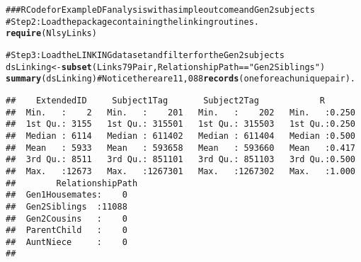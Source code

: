 \documentclass[letterpaper]{article}\usepackage{graphicx, color}
\makeatletter
\newcommand{\hlfunctioncall}[1]{\textcolor[rgb]{0.501960784313725,0,0.329411764705882}{\textbf{#1}}}%
\newcommand{\hlstring}[1]{\textcolor[rgb]{0.6,0.6,1}{#1}}%
\newcommand{\hlcomment}[1]{\textcolor[rgb]{0.180392156862745,0.6,0.341176470588235}{#1}}%
\newenvironment{kframe}{%
 \def\at@end@of@kframe{}%
 \ifinner\ifhmode%
  \def\at@end@of@kframe{\end{minipage}}%
  \begin{minipage}{\columnwidth}%
 \fi\fi%
 \def\FrameCommand##1{\hskip\@totalleftmargin \hskip-\fboxsep
 \colorbox{shadecolor}{##1}\hskip-\fboxsep
     \hskip-\linewidth \hskip-\@totalleftmargin \hskip\columnwidth}%
 \MakeFramed {\advance\hsize-\width
   \@totalleftmargin\z@ \linewidth\hsize
   \@setminipage}}%
 {\par\unskip\endMakeFramed%
 \at@end@of@kframe}
\newenvironment{knitrout}{}{} %
\makeatother
\begin{document}
\begin{knitrout}
\color{fgcolor}\begin{kframe}
\begin{alltt}
\hlcomment{### R Code for Example DF analysis with a simple outcome and Gen2 subjects}
\hlcomment{#Step 2: Load the package containing the linking routines.}
\hlfunctioncall{require}(NlsyLinks) 

\hlcomment{#Step 3: Load the LINKING dataset and filter for the Gen2 subjects}
dsLinking <- \hlfunctioncall{subset}(Links79Pair, RelationshipPath==\hlstring{"Gen2Siblings"})
\hlfunctioncall{summary}(dsLinking) \hlcomment{#Notice there are 11,088 \hlfunctioncall{records} (one for each unique pair).}
\end{alltt}
\begin{verbatim}
##    ExtendedID     Subject1Tag       Subject2Tag            R        
##  Min.   :    2   Min.   :    201   Min.   :    202   Min.   :0.250  
##  1st Qu.: 3155   1st Qu.: 315501   1st Qu.: 315503   1st Qu.:0.250  
##  Median : 6114   Median : 611402   Median : 611404   Median :0.500  
##  Mean   : 5933   Mean   : 593658   Mean   : 593660   Mean   :0.417  
##  3rd Qu.: 8511   3rd Qu.: 851101   3rd Qu.: 851103   3rd Qu.:0.500  
##  Max.   :12673   Max.   :1267301   Max.   :1267302   Max.   :1.000  
##        RelationshipPath
##  Gen1Housemates:    0  
##  Gen2Siblings  :11088  
##  Gen2Cousins   :    0  
##  ParentChild   :    0  
##  AuntNiece     :    0  
## 
\end{verbatim}
\begin{alltt}


\end{alltt}
\end{kframe}
\end{knitrout}
\end{document}
